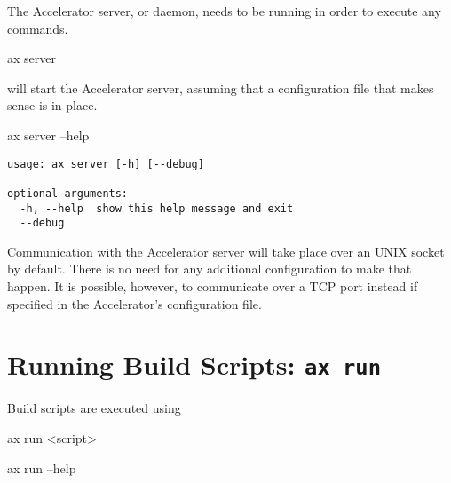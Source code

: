 The Accelerator server, or daemon, needs to be running in order to
execute any commands.
\begin{shell}
ax server
\end{shell}
will start the Accelerator server, assuming that a configuration file
that makes sense is in place.
\begin{shell}
ax server --help
\end{shell}
\begin{snugshade}
\begin{verbatim}
usage: ax server [-h] [--debug]

optional arguments:
  -h, --help  show this help message and exit
  --debug
\end{verbatim}%
\end{snugshade}
Communication with the Accelerator server will take place over an UNIX
socket by default.  There is no need for any additional configuration
to make that happen.  It is possible, however, to communicate over a
TCP port instead if specified in the Accelerator's configuration file.





\section{Running Build Scripts: \texttt{ax run}}
\label{sec:exec_runner}
Build scripts are executed using
\begin{python}
ax run <script>
\end{python}

\begin{python}
ax run --help
\end{python}

